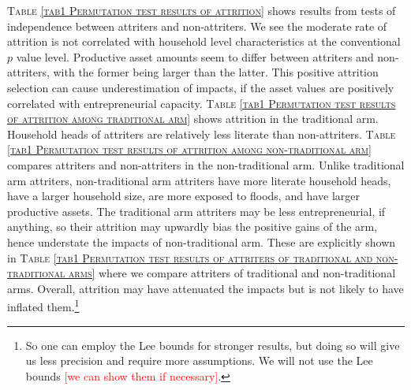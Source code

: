 	\textsc{\normalsize Table \ref{tab1 Permutation test results of attrition}} shows results from tests of independence between attriters and non-attriters. We see the moderate rate of attrition is not correlated with household level characteristics at the conventional $p$ value level. Productive asset amounts seem to differ between attriters and non-attriters, with the former being larger than the latter. This positive attrition selection can cause underestimation of impacts, if the asset values are positively correlated with entrepreneurial capacity. \textsc{\normalsize Table \ref{tab1 Permutation test results of attrition among traditional arm}} shows attrition in the \textsf{traditional} arm. Household heads of attriters are relatively less literate than non-attriters. \textsc{\normalsize Table \ref{tab1 Permutation test results of attrition among non-traditional arm}} compares attriters and non-attriters in the non-\textsf{traditional} arm. Unlike \textsf{traditional} arm attriters, non-\textsf{traditional} arm attriters have more literate household heads, have a larger household size, are more exposed to floods, and have larger productive assets. The \textsf{traditional} arm attriters may be less entrepreneurial, if anything, so their attrition may upwardly bias the positive gains of the arm, hence understate the impacts of non-\textsf{traditional} arm. These are explicitly shown in \textsc{\normalsize Table \ref{tab1 Permutation test results of attriters of traditional and non-traditional arms}} where we compare attriters of \textsf{traditional} and non-\textsf{traditional} arms. Overall, attrition may have attenuated the impacts but is not likely to have inflated them.\footnote{So one can employ the Lee bounds for stronger results, but doing so will give us less precision and require more assumptions. We will not use the Lee bounds \textcolor{red}{[we can show them if necessary]}. }


